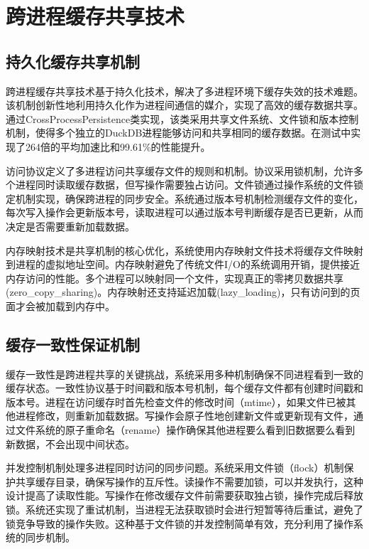 \section{跨进程缓存共享技术}

\subsection{持久化缓存共享机制}

跨进程缓存共享技术基于持久化技术，解决了多进程环境下缓存失效的技术难题。该机制创新性地利用持久化作为进程间通信的媒介，实现了高效的缓存数据共享。通过CrossProcessPersistence类实现，该类采用共享文件系统、文件锁和版本控制机制，使得多个独立的DuckDB进程能够访问和共享相同的缓存数据。在测试中实现了264倍的平均加速比和99.61\%的性能提升。

访问协议定义了多进程访问共享缓存文件的规则和机制。协议采用锁机制，允许多个进程同时读取缓存数据，但写操作需要独占访问。文件锁通过操作系统的文件锁定机制实现，确保跨进程的同步安全。系统通过版本号机制检测缓存文件的变化，每次写入操作会更新版本号，读取进程可以通过版本号判断缓存是否已更新，从而决定是否需要重新加载数据。

内存映射技术是共享机制的核心优化，系统使用内存映射文件技术将缓存文件映射到进程的虚拟地址空间。内存映射避免了传统文件I/O的系统调用开销，提供接近内存访问的性能。多个进程可以映射同一个文件，实现真正的零拷贝数据共享(zero\_copy\_sharing)。内存映射还支持延迟加载(lazy\_loading)，只有访问到的页面才会被加载到内存中。

\subsection{缓存一致性保证机制}

缓存一致性是跨进程共享的关键挑战，系统采用多种机制确保不同进程看到一致的缓存状态。一致性协议基于时间戳和版本号机制，每个缓存文件都有创建时间戳和版本号。进程在访问缓存时首先检查文件的修改时间（mtime），如果文件已被其他进程修改，则重新加载数据。写操作会原子性地创建新文件或更新现有文件，通过文件系统的原子重命名（rename）操作确保其他进程要么看到旧数据要么看到新数据，不会出现中间状态。

并发控制机制处理多进程同时访问的同步问题。系统采用文件锁（flock）机制保护共享缓存目录，确保写操作的互斥性。读操作不需要加锁，可以并发执行，这种设计提高了读取性能。写操作在修改缓存文件前需要获取独占锁，操作完成后释放锁。系统还实现了重试机制，当进程无法获取锁时会进行短暂等待后重试，避免了锁竞争导致的操作失败。这种基于文件锁的并发控制简单有效，充分利用了操作系统的同步机制。

